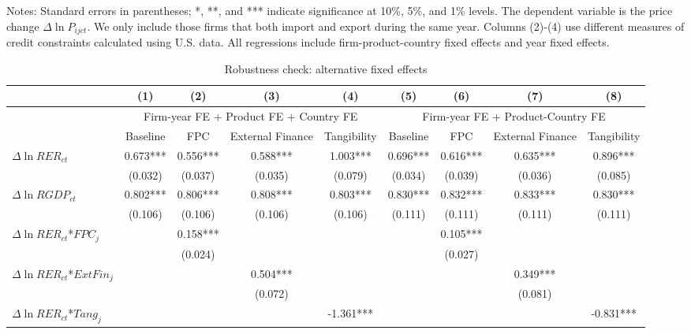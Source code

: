 \documentclass[12pt]{article}
\begin{document}
\begin{table}
\begin{threeparttable}
		\begin{tablenotes}
			\footnotesize
			\item[Notes:] Standard errors in parentheses; *, **, and *** indicate significance at 10\%, 5\%, and 1\% levels. The dependent variable is the price change $\Delta \ln P_{ijct}$. We only include those firms that both import and export during the same year. Columns (2)-(4) use different measures of credit constraints calculated using U.S. data. All regressions include firm-product-country fixed effects and year fixed effects.
		\end{tablenotes}
	\end{threeparttable}
	\label{tab.robust.tradetype}
\end{table}

\begin{table}
	\centering
	\caption{Robustness check: alternative fixed effects}
	\begin{threeparttable}
		\begin{tabular}{lcccccccc}
			\toprule
			& (1)   & (2)   & (3)   & (4) &  (5)  &  (6)  & (7)  & (8)\\
			\midrule
			& \multicolumn{4}{c}{Firm-year FE + Product FE + Country FE} & \multicolumn{4}{c}{Firm-year FE + Product-Country FE}\\
			& Baseline & FPC   & External Finance & Tangibility & Baseline & FPC & External Finance & Tangibility\\
			\midrule
			$\Delta \ln RER_{ct}$ & 0.673*** & 0.556*** & 0.588*** & 1.003*** & 0.696*** & 0.616*** & 0.635*** & 0.896*** \\
			& (0.032) & (0.037) & (0.035) & (0.079) & (0.034) & (0.039) & (0.036) & (0.085)\\
			$\Delta \ln RGDP_{ct}$ & 0.802*** & 0.806*** & 0.808*** & 0.803*** & 0.830*** & 0.832*** & 0.833*** & 0.830***\\
			& (0.106) & (0.106) & (0.106) & (0.106) & (0.111) & (0.111) & (0.111) & (0.111)\\
			$\Delta \ln RER_{ct}$*$FPC_{j}$ &       & 0.158*** &       &  && 0.105*** &&\\
			&       & (0.024) &       &  &&(0.027)&&\\
			$\Delta \ln RER_{ct}$*$ExtFin_{j}$ &       &       & 0.504*** &  &&  &0.349***&\\
			&       &       & (0.072) &  &&&(0.081)&\\
			$\Delta \ln RER_{ct}$*$Tang_{j}$ &       &       &      & -1.361*** &&&&-0.831***\\

\end{tabular}
\end{threeparttable}
\end{table}
\end{document}
